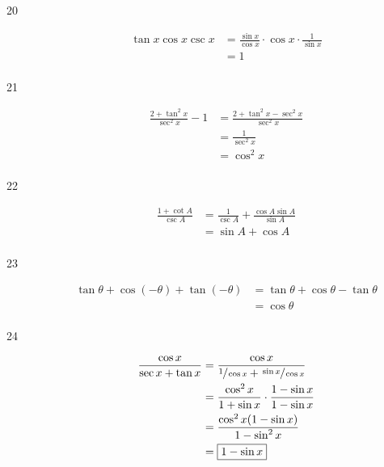 \documentclass{exam}
\begin{document}
\begin{description}
      \item[20] 
        \begin{align*}
          \tan x \cos x \csc x & = \frac{\sin x}{\cos x} \cdot \cos x \cdot \frac{1}{\sin x} \\
                               & = \boxed{ 1 } \\
        \end{align*}

      \item[21] 
        \begin{align*}
          \frac{2 + \tan^2 x}{\sec^2 x} - 1 & = \frac{2 + \tan^2 x - \sec^2 x}{\sec^2 x} \\
                                            & = \frac{1}{\sec^2 x} \\
                                            & = \boxed{ \cos^2 x } \\
        \end{align*}

      \item[22] 
        \begin{align*}
          \frac{1 + \cot A}{\csc A} & = \frac{1}{\csc A} + \frac{\cos A \sin A}{\sin A} \\
                                    & = \boxed{ \sin A + \cos A } \\
        \end{align*}

      \item[23] 
        \begin{align*}
          \tan \theta + \cos(- \theta) + \tan(- \theta) & = \tan \theta + \cos \theta - \tan \theta \\
                                                        & = \boxed{ \cos \theta } \\
        \end{align*}

      \item[24] 
        \begin{align*}
          \frac{\cos x}{\sec x + \tan x} & = \frac{\cos x}{\sfrac{1}{\cos x} + \sfrac{\sin x}{\cos x}} \\
                                         & = \frac{\cos^2 x}{1 + \sin x} \cdot \frac{1 - \sin x}{1 - \sin x} \\
                                         & = \frac{\cos^2 x (1 - \sin x)}{1 - \sin^2 x} \\
                                         & = \boxed{ 1 - \sin x } \\
        \end{align*}


\end{description}
\end{document}
